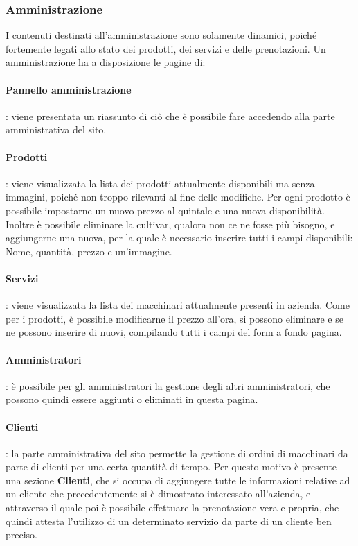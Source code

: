 \subsubsection{Amministrazione}
I contenuti destinati all'amministrazione sono solamente dinamici, poiché fortemente legati allo stato dei prodotti, dei servizi e delle prenotazioni. Un amministrazione ha a disposizione le pagine di:
\paragraph{Pannello amministrazione}: viene presentata un riassunto di ciò che è possibile fare accedendo alla parte amministrativa del sito.
\paragraph{Prodotti}: viene visualizzata la lista dei prodotti attualmente disponibili ma senza immagini, poiché non troppo rilevanti al fine delle modifiche. Per ogni prodotto è possibile impostarne un nuovo prezzo al quintale e una nuova disponibilità. Inoltre è possibile eliminare la cultivar, qualora non ce ne fosse più bisogno, e aggiungerne una nuova, per la quale è necessario inserire tutti i campi disponibili: Nome, quantità, prezzo e un'immagine.
\paragraph{Servizi}: viene visualizzata la lista dei macchinari attualmente presenti in azienda. Come per i prodotti, è possibile modificarne il prezzo all'ora, si possono eliminare e se ne possono inserire di nuovi, compilando tutti i campi del form a fondo pagina.
\paragraph{Amministratori}: è possibile per gli amministratori la gestione degli altri amministratori, che possono quindi essere aggiunti o eliminati in questa pagina.
\paragraph{Clienti}: la parte amministrativa del sito permette la gestione di ordini di macchinari da parte di clienti per una certa quantità di tempo. Per questo motivo è presente una sezione \textbf{Clienti}, che si occupa di aggiungere tutte le informazioni relative ad un cliente che precedentemente si è dimostrato interessato all'azienda, e attraverso il quale poi è possibile effettuare la prenotazione vera e propria, che quindi attesta l'utilizzo di un determinato servizio da parte di un cliente ben preciso.
